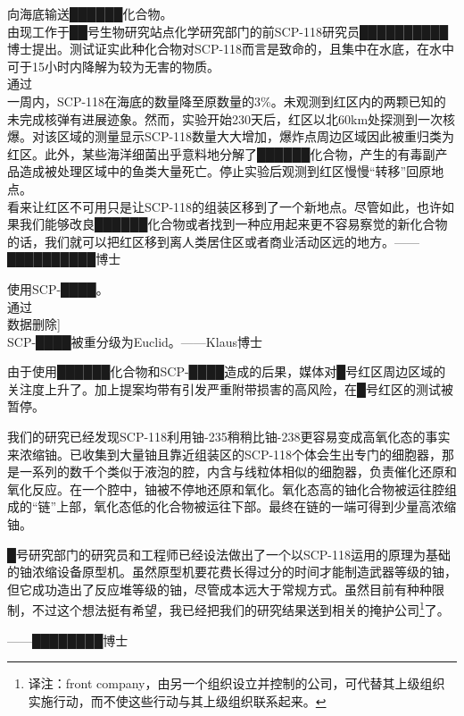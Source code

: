 \begin{scpbox}
向海底输送██████化合物。\\
由现工作于██号生物研究站点化学研究部门的前SCP-118研究员██████████博士提出。测试证实此种化合物对SCP-118而言是致命的，且集中在水底，在水中可于15小时内降解为较为无害的物质。\\
通过\\
一周内，SCP-118在海底的数量降至原数量的3\%。未观测到红区内的两颗已知的未完成核弹有进展迹象。然而，实验开始230天后，红区以北60km处探测到一次核爆。对该区域的测量显示SCP-118数量大大增加，爆炸点周边区域因此被重归类为红区。此外，某些海洋细菌出乎意料地分解了██████化合物，产生的有毒副产品造成被处理区域中的鱼类大量死亡。停止实验后观测到红区慢慢“转移”回原地点。\\
看来让红区不可用只是让SCP-118的组装区移到了一个新地点。尽管如此，也许如果我们能够改良██████化合物或者找到一种应用起来更不容易察觉的新化合物的话，我们就可以把红区移到离人类居住区或者商业活动区远的地方。——██████████博士

使用SCP-████。\\
通过\\
\bb{结果：}{[}数据删除]\\
SCP-████被重分级为Euclid。——Klaus博士

由于使用██████化合物和SCP-████造成的后果，媒体对█号红区周边区域的关注度上升了。加上提案均带有引发严重附带损害的高风险，在█号红区的测试被暂停。

\end{scpbox}


\begin{scpbox}

我们的研究已经发现SCP-118利用铀-235稍稍比铀-238更容易变成高氧化态的事实来浓缩铀。已收集到大量铀且靠近组装区的SCP-118个体会生出专门的细胞器，那是一系列的数千个类似于液泡的腔，内含与线粒体相似的细胞器，负责催化还原和氧化反应。在一个腔中，铀被不停地还原和氧化。氧化态高的铀化合物被运往腔组成的“链”上部，氧化态低的化合物被运往下部。最终在链的一端可得到少量高浓缩铀。

█号研究部门的研究员和工程师已经设法做出了一个以SCP-118运用的原理为基础的铀浓缩设备原型机。虽然原型机要花费长得过分的时间才能制造武器等级的铀，但它成功造出了反应堆等级的铀，尽管成本远大于常规方式。虽然目前有种种限制，不过这个想法挺有希望，我已经把我们的研究结果送到相关的掩护公司\footnote{译注：front company，由另一个组织设立并控制的公司，可代替其上级组织实施行动，而不使这些行动与其上级组织联系起来。}了。

——████████博士

\end{scpbox}
